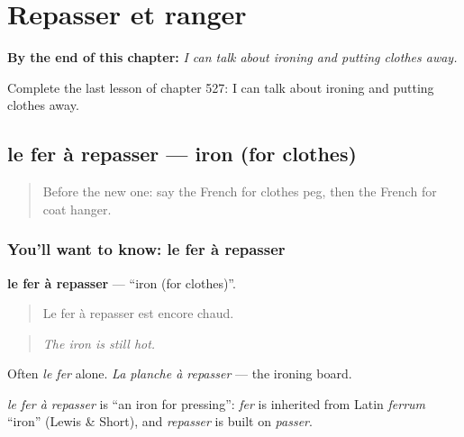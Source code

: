 
\chapter{Repasser et ranger}
\label{ch:fr-repasser-et-ranger}

\begin{chapteropening}
\textbf{By the end of this chapter:} \emph{I can talk about ironing and putting clothes away.}

Complete the last lesson of chapter 527: I can talk about ironing and putting clothes away.
\end{chapteropening}

\section[le fer à repasser]{le fer à repasser — iron (for clothes)}

\label{lesson:FR-C527-fer-a-repasser}



\begin{quote}
Before the new one: say the French for clothes peg, then the French for coat hanger.
\end{quote}

\subsection*{You'll want to know: le fer à repasser}
\textbf{le fer à repasser} — \textquotedblleft{}iron (for clothes)\textquotedblright{}.

\begin{quote}
Le fer à repasser est encore chaud.
\end{quote}

\begin{quote}
\emph{The iron is still hot.}
\end{quote}

Often \emph{le fer} alone. \emph{La planche à repasser} — the ironing board.

\begin{cousinweb}
\emph{le fer à repasser} is \textquotedblleft{}an iron for pressing\textquotedblright{}: \emph{fer} is inherited from Latin \emph{ferrum} \textquotedblleft{}iron\textquotedblright{} (Lewis \& Short), and \emph{repasser} is built on \emph{passer}.
\end{cousinweb}

